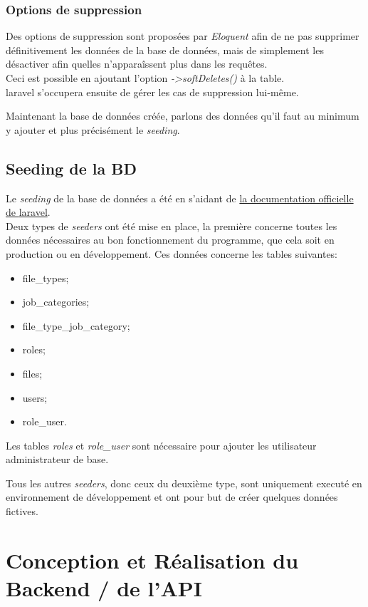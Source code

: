 \documentclass[
    iai, %
    il, %
]{heig-tb}
\begin{document}
\subsection{Options de suppression}
Des options de suppression sont proposées par \emph{Eloquent} afin de ne pas supprimer définitivement les données de la base de données, mais de simplement les désactiver afin quelles n'apparaîssent plus dans les requêtes.\\
Ceci est possible en ajoutant l'option \emph{->softDeletes()} à la table.\\
\Gls{laravel} s'occupera ensuite de gérer les cas de suppression lui-même.

Maintenant la base de données créée, parlons des données qu'il faut au minimum y ajouter et plus précisément le \emph{seeding}.

\section{Seeding de la BD}
Le \emph{seeding} de la base de données a été en s'aidant de \href{https://laravel.com/docs/9.x/seeding}{la documentation officielle de \Gls{laravel}}. \\
Deux types de \emph{seeders} ont été mise en place, la première concerne toutes les données nécessaires au bon fonctionnement du programme, que cela soit en production ou en développement. Ces données  concerne les tables suivantes:
\begin{itemize}
    \item file\_types;
    \item job\_categories;
    \item file\_type\_job\_category;
    \item roles;
    \item files;
    \item users;
    \item role\_user.
\end{itemize}

Les tables \emph{roles} et \emph{role_user} sont nécessaire pour ajouter les utilisateur administrateur de base.

Tous les autres \emph{seeders}, donc ceux du deuxième type, sont uniquement executé en environnement de développement et ont pour but de créer quelques données fictives.

\chapter{Conception et Réalisation du Backend / de l'API}
\end{document}

